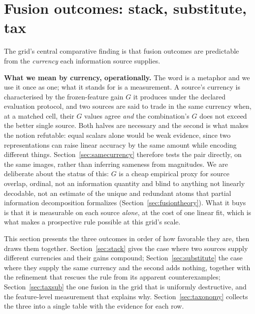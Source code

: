 \section{Fusion outcomes: stack, substitute, tax}\label{sec:fusion}

The grid's central comparative finding is that fusion outcomes are
predictable from the \emph{currency} each information source supplies.

\textbf{What we mean by currency, operationally.} The word is a metaphor and
we use it once as one; what it stands for is a measurement. A source's
currency is characterised by the frozen-feature gain $G$ it produces under the
declared evaluation protocol, and two sources are said to trade in the same
currency when, at a matched cell, their $G$ values agree \emph{and} the
combination's $G$ does not exceed the better single source. Both halves are
necessary and the second is what makes the notion refutable: equal scalars
alone would be weak evidence, since two representations can raise linear
accuracy by the same amount while encoding different things.
Section~\ref{sec:samecurrency} therefore tests the pair directly, on the same
images, rather than inferring sameness from magnitudes. We are deliberate
about the status of this: $G$ is a cheap empirical proxy for source overlap, ordinal, not an information quantity and blind to anything not linearly
decodable, not an estimate of the unique and redundant atoms that partial
information decomposition formalizes (Section~\ref{sec:fusiontheory}). What it
buys is that it is measurable on each source \emph{alone}, at the cost of one
linear fit, which is what makes a prospective rule possible at this grid's
scale.

This section presents the three outcomes in order of how favorable they
are, then draws them together. Section~\ref{sec:stack} gives the case
where two sources supply different currencies and their gains compound;
Section~\ref{sec:substitute} the case where they supply the same currency
and the second adds nothing, together with the refinement that rescues
the rule from its apparent counterexamples;
Section~\ref{sec:taxsub} the one fusion in the grid that is uniformly
destructive, and the feature-level measurement that explains why.
Section~\ref{sec:taxonomy} collects the three into a single table with
the evidence for each row.

